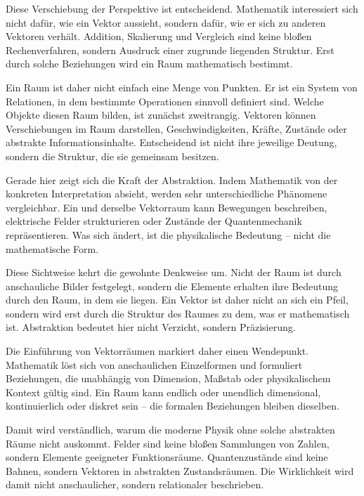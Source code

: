 Diese Verschiebung der Perspektive ist entscheidend.
Mathematik interessiert sich nicht dafür,
wie ein Vektor aussieht,
sondern dafür,
wie er sich zu anderen Vektoren verhält.
Addition,
Skalierung
und Vergleich sind keine bloßen Rechenverfahren,
sondern Ausdruck einer zugrunde liegenden Struktur.
Erst durch solche Beziehungen wird ein Raum mathematisch bestimmt.

Ein Raum ist daher nicht einfach eine Menge von Punkten.
Er ist ein System von Relationen,
in dem bestimmte Operationen sinnvoll definiert sind.
Welche Objekte diesen Raum bilden,
ist zunächst zweitrangig.
Vektoren können Verschiebungen im Raum darstellen,
Geschwindigkeiten,
Kräfte,
Zustände
oder abstrakte Informationsinhalte.
Entscheidend ist nicht ihre jeweilige Deutung,
sondern die Struktur,
die sie gemeinsam besitzen.

Gerade hier zeigt sich die Kraft der Abstraktion.
Indem Mathematik von der konkreten Interpretation absieht,
werden sehr unterschiedliche Phänomene vergleichbar.
Ein und derselbe Vektorraum
kann Bewegungen beschreiben,
elektrische Felder strukturieren
oder Zustände der Quantenmechanik repräsentieren.
Was sich ändert,
ist die physikalische Bedeutung --
nicht die mathematische Form.

Diese Sichtweise kehrt die gewohnte Denkweise um.
Nicht der Raum ist durch anschauliche Bilder festgelegt,
sondern die Elemente erhalten ihre Bedeutung
durch den Raum, in dem sie liegen.
Ein Vektor ist daher nicht \glqq an sich\grqq{} ein Pfeil,
sondern wird erst durch die Struktur des Raumes zu dem,
was er mathematisch ist.
Abstraktion bedeutet hier nicht Verzicht,
sondern Präzisierung.

Die Einführung von Vektorräumen markiert daher einen Wendepunkt.
Mathematik löst sich von anschaulichen Einzelformen
und formuliert Beziehungen,
die unabhängig von Dimension,
Maßstab
oder physikalischem Kontext gültig sind.
Ein Raum kann endlich oder unendlich dimensional,
kontinuierlich oder diskret sein --
die formalen Beziehungen bleiben dieselben.

Damit wird verständlich,
warum die moderne Physik
ohne solche abstrakten Räume nicht auskommt.
Felder sind keine bloßen Sammlungen von Zahlen,
sondern Elemente geeigneter Funktionsräume.
Quantenzustände sind keine Bahnen,
sondern Vektoren in abstrakten Zustandsräumen.
Die Wirklichkeit
wird damit nicht anschaulicher,
sondern relationaler beschrieben.

